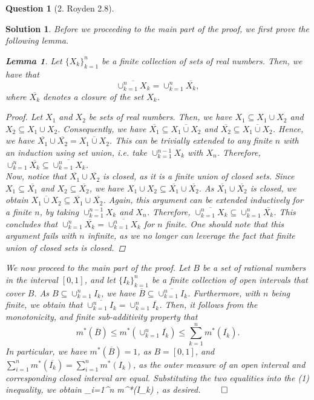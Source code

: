 \documentclass{article} %
\def\eQb#1\eQe{\begin{eqnarray*}#1\end{eqnarray*}}
\theoremstyle{quest}
\newtheorem*{lemma}{Lemma}
\newtheorem*{question}{Question}
\newtheorem*{solution}{Solution}
\begin{document}
\begin{question}[2. Royden 2.8]
\end{question}
\begin{solution}
Before we proceeding to the main part of the proof, we first prove the following lemma.
\begin{lemma}
Let $\{ X_k \}_{k=1}^{n}$ be a finite collection of sets of real numbers. Then, we have that
\[
\overline{\cup_{k=1}^{n} X_k } = \cup_{k=1}^{n} \overline{X_k},
\]
where $\overline{X_k}$ denotes a closure of the set $X_k$.
\end{lemma}
\begin{proof}
Let $X_1$ and $X_2$ be sets of real numbers. Then,
we have $X_1 \subseteq X_1 \cup X_2$ and $X_2 \subseteq X_1 \cup X_2$. Consequently, we have
$\overline{X_1} \subseteq \overline{X_1 \cup X_2}$ and $\overline{X_2} \subseteq \overline{X_1 \cup X_2}$.
Hence, we have $\overline{X_1} \cup \overline{X_2} = \overline{X_1 \cup X_2}$. 
This can be trivially extended
to any finite $n$ with an induction using set union, i.e. take $\cup_{k=1}^{n-1} X_k$ with $X_n$.
Therefore, $\cup_{k=1}^{n} \overline{X_k} \subseteq \overline{\cup_{k=1}^{n} X_k}$. \\

Now, notice that $\overline{X_1} \cup \overline{X_2}$ is closed, as it is a finite union of closed sets.
Since $X_1 \subseteq \overline{X_1}$ and $X_2 \subseteq \overline{X_2}$, we have $X_1
\cup X_2 \subseteq \overline{X_1} \cup \overline{X_2}$. As $\overline{X_1} \cup \overline{X_2}$ is
closed, we obtain $\overline{X_1 \cup X_2} \subseteq \overline{X_1} \cup \overline{X_2}$. Again,
this argument can be extended inductively for a finite $n$, by taking $\cup_{k=1}^{n-1} X_k$ and
$X_n$. Therefore, $\overline{\cup_{k=1}^{n} X_k} \subseteq \cup_{k=1}^{n} \overline{X_k}$.
This concludes
that $\cup_{k=1}^{n} \overline{X_k} = \overline{\cup_{k=1}^{n} X_k}$ for $n$ finite.
One should note that this argument fails with $n$ infinite, as we no longer can leverage the fact
that finite union of closed sets is closed.
\end{proof}


We now proceed to the main part of the proof. 
Let $B$ be a set of rational numbers in the interval $[0,1]$, and let $\{ I_k \}_{k=1}^{n}$ be a 
finite collection of open intervals that cover $B$.
As $B \subseteq \cup_{k=1}^{n} I_k$, we have $\overline{B} \subseteq 
\overline{\cup_{k=1}^{n}I_k}$. Furthermore, with $n$ 
being finite, we obtain that $\overline{\cup_{k=1}^{n} I_k} =
\cup_{k=1}^{n} \overline{I_k}$. Then, it follows from the monotonicity, and finite sub-additivity
property that 
\begin{equation}
m^{*}(\overline{B}) \leq m^{*}( \cup_{k=1}^{n} \overline{ I_k } ) \leq \sum_{k=1}^{n} 
m^{*}(\overline{I_k}).
\end{equation}
In particular, we have $m^{*}(\overline{B}) = 1$, as $B = [0,1]$, and 
$\sum_{i=1}^{n} m^{*}(\overline{I_k}) = \sum_{i=1}^{n} m^{*}(I_k)$, as the outer measure
of an open interval and corresponding closed interval are equal. Substituting the two
equalities into the (1) inequality, we obtain
\eQb
\sum_{i=1}^{n} m^{*}(I_k) ,
\eQe
as desired. $\qed$
\end{solution}
\end{document}
